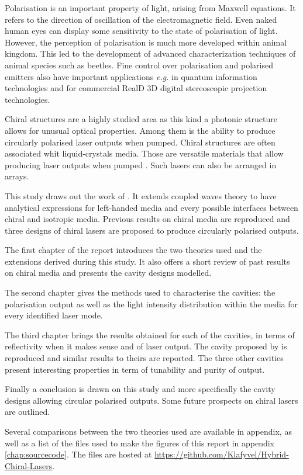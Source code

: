 
Polarisation is an important property of light, arising from Maxwell equations\cite{weir_optical_2019}. It refers to the direction of oscillation of the electromagnetic field. Even naked human eyes can display some sensitivity to the state of polarisation of light\cite{le_floch_polarisation_2010}. However, the perception of polarisation is much more developed within animal kingdom. This led to the development of advanced characterization techniques of animal species such as beetles\cite{carter_variation_2016}. Fine control over polarisation and polarised emitters also have important applications \textit{e.g.} in quantum information technologies\cite{bennett_quantum_2014} and for commercial RealD 3D digital
stereoscopic projection technologies\cite{mendiburu_chapter_2009}.

Chiral structures are a highly studied area\cites{belyakova_optical_2011}{harutyunyan_optical_2007}{mccall_simplified_2009}{mccall_properties_2009} as this kind a photonic structure allows for unusual optical properties. Among them is the ability to produce circularly polarised laser outputs when pumped\cites{topf_modes_2014}{kopp_twist_2002}{oldano_comment_2004}. Chiral structures are often associated whit liquid-crystals media. Those are versatile materials that allow producing laser outputs when pumped \cites{coles_liquid-crystal_2010}{gardiner_paintable_2011}. Such lasers can also be arranged in arrays\cite{hands_two-dimensional_2008}.

This study draws out the work of \textcite{topf_modes_2014}. It extends coupled waves theory to have analytical expressions for left-handed media and every possible interfaces between chiral and isotropic media. Previous results on chiral media are reproduced and three designs of chiral lasers are proposed to produce circularly polarised outputs.

The first chapter of the report introduces the two theories used and the extensions derived during this study. It also offers a short review of past results on chiral media and presents the cavity designs modelled.

The second chapter gives the methods used to characterise the cavities: the polarisation output as well as the light intensity distribution within the media for every identified laser mode.

The third chapter brings the results obtained for each of the cavities, in terms of reflectivity when it makes sense and of laser output. The cavity proposed by \textcite{topf_modes_2014} is reproduced and similar results to theirs are reported. The three other cavities present interesting properties in term of tunability and purity of output.

Finally a conclusion is drawn on this study and more specifically the cavity designs allowing circular polarised outputs. Some future prospects on chiral lasers are outlined.

Several comparisons between the two theories used are available in appendix, as well as a list of the files used to make the figures of this report in appendix \ref{chap:sourcecode}. The files are hosted at \url{https://github.com/Klafyvel/Hybrid-Chiral-Lasers}.